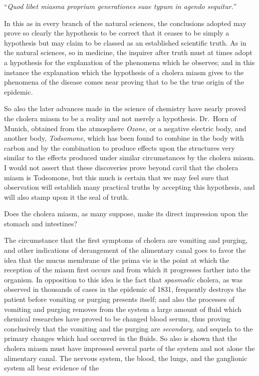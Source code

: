 ``\emph{Quod libet miasma proprium generationes suae typum
in agendo sequitur.}''

In this as in every branch of the natural sciences, the conclusions
adopted may prove so clearly the hypothesis to be correct that it ceases
to be simply a hypothesis but may claim to be classed as an established
scientific truth. As in the natural sciences, so in medicine, the inquirer
after truth must at times adopt a hypothesis for the explanation of the
phenomena which he observes; and in this instance the explanation
which the hypothesis of a cholera miasm gives to the phenomena of
the disease comes near proving that to be the true origin of the
epidemic.

So also the later advances made in the science of chemistry have
nearly proved the cholera miasm to be a reality and not merely a
hypothesis. Dr.\ Horn of Munich, obtained from the atmosphere
\emph{Ozone}, or a negative electric body, and another body, \emph{Todsomone},
which has been found to combine in the body with carbon and by the
combination to produce effects upon the structures very similar to the
effects produced under similar circumstances by the cholera miasm. I
would not assert that these discoveries prove beyond cavil that the
cholera miasm is Todsomone, but this much is certain that we may feel
sure that observation will establish many practical truths by accepting
this hypothesis, and will also stamp upon it the seal of truth.

\vspace{\baselineskip}

Does the cholera miasm, as many suppose, make its direct impression
upon the stomach and intestines?

The circumstance that the first symptoms of cholera are vomiting and
purging, and other indications of derangement of the alimentary canal
goes to favor the idea that the mucus membrane of the prima vie is the
point at which the reception of the miasm first occurs and from which
it progresses farther into the organism. In opposition to this idea is
the fact that \emph{spasmodic} cholera, as was observed in thousands of cases
in the epidemic of 1831, frequently destroys the patient before vomiting
or purging presents itself; and also the processes of vomiting and
purging removes from the system a large amount of fluid which chemical
researches have proved to be changed blood serum, thus proving
conclusively that the vomiting and the purging are \emph{secondary}, and
sequela to the primary changes which had occurred in the fluids. So
also is shown that the cholera miasm must have impressed several parts
of the system and not alone the alimentary canal. The nervous system,
the blood, the lungs, and the ganglionic system all bear evidence of the\endinput